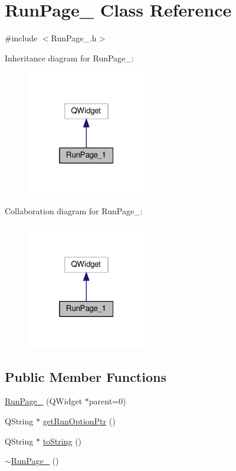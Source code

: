 \hypertarget{class_run_page__1}{\section{Run\-Page\-\_ Class Reference}
\label{class_run_page__1}
}


{\ttfamily \#include $<$Run\-Page\-\_.\-h$>$}



Inheritance diagram for Run\-Page\-\_\-:\nopagebreak
\begin{figure}[H]
\begin{center}
\leavevmode
\includegraphics[width=148pt]{class_run_page__1__inherit__graph}
\end{center}
\end{figure}


Collaboration diagram for Run\-Page\-\_\-:\nopagebreak
\begin{figure}[H]
\begin{center}
\leavevmode
\includegraphics[width=148pt]{class_run_page__1__coll__graph}
\end{center}
\end{figure}
\subsection*{Public Member Functions}
\begin{DoxyCompactItemize}
\item 
\hyperlink{class_run_page__1_ad82b0ef9923370cba82eb4cbabc93545}{Run\-Page\-\_} (Q\-Widget $\ast$parent=0)
\item 
Q\-String $\ast$ \hyperlink{class_run_page__1_a4c13dfea0a52e4256539769a11981e03}{get\-Run\-Option\-Ptr} ()
\item 
Q\-String $\ast$ \hyperlink{class_run_page__1_a87003006f1f962dc85ca7ddfecf0c5ec}{to\-String} ()
\item 
\hyperlink{class_run_page__1_a2f02b6cad18bd083be7a3caed9341de1}{$\sim$\-Run\-Page\-\_} ()
\end{DoxyCompactItemize}
